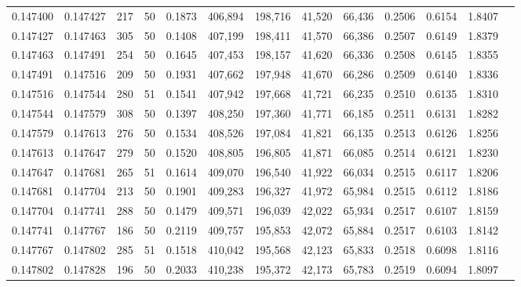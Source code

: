 \begin{tabular}{rrrrrrrrrrrrr}
0.147400 & 0.147427 &   217 &  50 &                                     0.1873 & 406,894 & 198,716 &  41,520 &  66,436 & 0.2506 & 0.6154 & 1.8407 \\
0.147427 & 0.147463 &   305 &  50 &                                     0.1408 & 407,199 & 198,411 &  41,570 &  66,386 & 0.2507 & 0.6149 & 1.8379 \\
0.147463 & 0.147491 &   254 &  50 &                                     0.1645 & 407,453 & 198,157 &  41,620 &  66,336 & 0.2508 & 0.6145 & 1.8355 \\
0.147491 & 0.147516 &   209 &  50 &                                     0.1931 & 407,662 & 197,948 &  41,670 &  66,286 & 0.2509 & 0.6140 & 1.8336 \\
0.147516 & 0.147544 &   280 &  51 &                                     0.1541 & 407,942 & 197,668 &  41,721 &  66,235 & 0.2510 & 0.6135 & 1.8310 \\
0.147544 & 0.147579 &   308 &  50 &                                     0.1397 & 408,250 & 197,360 &  41,771 &  66,185 & 0.2511 & 0.6131 & 1.8282 \\
0.147579 & 0.147613 &   276 &  50 &                                     0.1534 & 408,526 & 197,084 &  41,821 &  66,135 & 0.2513 & 0.6126 & 1.8256 \\
0.147613 & 0.147647 &   279 &  50 &                                     0.1520 & 408,805 & 196,805 &  41,871 &  66,085 & 0.2514 & 0.6121 & 1.8230 \\
0.147647 & 0.147681 &   265 &  51 &                                     0.1614 & 409,070 & 196,540 &  41,922 &  66,034 & 0.2515 & 0.6117 & 1.8206 \\
0.147681 & 0.147704 &   213 &  50 &                                     0.1901 & 409,283 & 196,327 &  41,972 &  65,984 & 0.2515 & 0.6112 & 1.8186 \\
0.147704 & 0.147741 &   288 &  50 &                                     0.1479 & 409,571 & 196,039 &  42,022 &  65,934 & 0.2517 & 0.6107 & 1.8159 \\
0.147741 & 0.147767 &   186 &  50 &                                     0.2119 & 409,757 & 195,853 &  42,072 &  65,884 & 0.2517 & 0.6103 & 1.8142 \\
0.147767 & 0.147802 &   285 &  51 &                                     0.1518 & 410,042 & 195,568 &  42,123 &  65,833 & 0.2518 & 0.6098 & 1.8116 \\
0.147802 & 0.147828 &   196 &  50 &                                     0.2033 & 410,238 & 195,372 &  42,173 &  65,783 & 0.2519 & 0.6094 & 1.8097 \\

\end{tabular}
